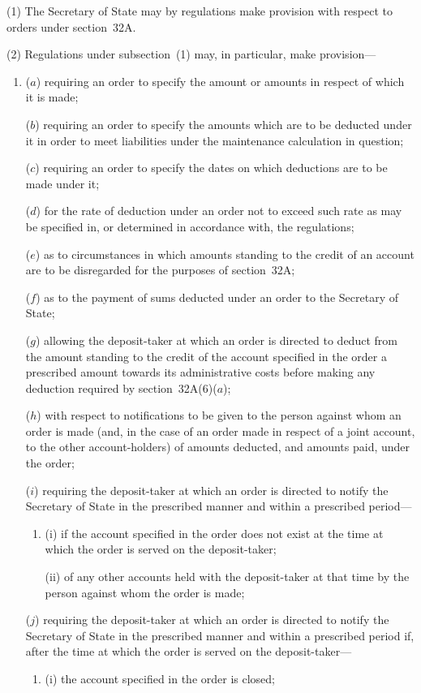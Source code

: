 \documentclass[12pt,a4paper]{article}
\begin{document}
(1) The Secretary of State may by regulations make provision with respect
to orders under section~32A.

(2) Regulations under subsection~(1) may, in particular, make provision---
\begin{enumerate}\item[]
($a$) requiring an order to specify the amount or amounts in respect of which it is made;

($b$) requiring an order to specify the amounts which are to be deducted under it
in order to meet liabilities under the maintenance calculation in question;

($c$) requiring an order to specify the dates on which deductions are to be made
under it;

($d$) for the rate of deduction under an order not to exceed such rate as may be
specified in, or determined in accordance with, the regulations;

($e$) as to circumstances in which amounts standing to the credit of an account
are to be disregarded for the purposes of section~32A;

($f$) as to the payment of sums deducted under an order to the Secretary of
State;

($g$) allowing the deposit-taker at which an order is directed to deduct from the
amount standing to the credit of the account specified in the order a prescribed
amount towards its administrative costs before making any deduction required
by section~32A(6)($a$);

($h$) with respect to notifications to be given to the person against whom an order
is made (and, in the case of an order made in respect of a joint account, to the
other account-holders) of amounts deducted, and amounts paid, under the
order;

($i$) requiring the deposit-taker at which an order is directed to notify the
Secretary of State  %
in the prescribed manner and within a prescribed period---
\begin{enumerate}\item[]
(i)
if the account specified in the order does not exist at the time at which
the order is served on the deposit-taker;

(ii)
of any other accounts held with the deposit-taker at that time by the
person against whom the order is made;
\end{enumerate}

($j$) requiring the deposit-taker at which an order is directed to notify the 
Secretary of State  %
in the prescribed manner and within a prescribed period if, after the time at which the order is served on the deposit-taker---
\begin{enumerate}\item[]
(i) the account specified in the order is closed;


\end{enumerate}
\end{enumerate}
\end{document}
